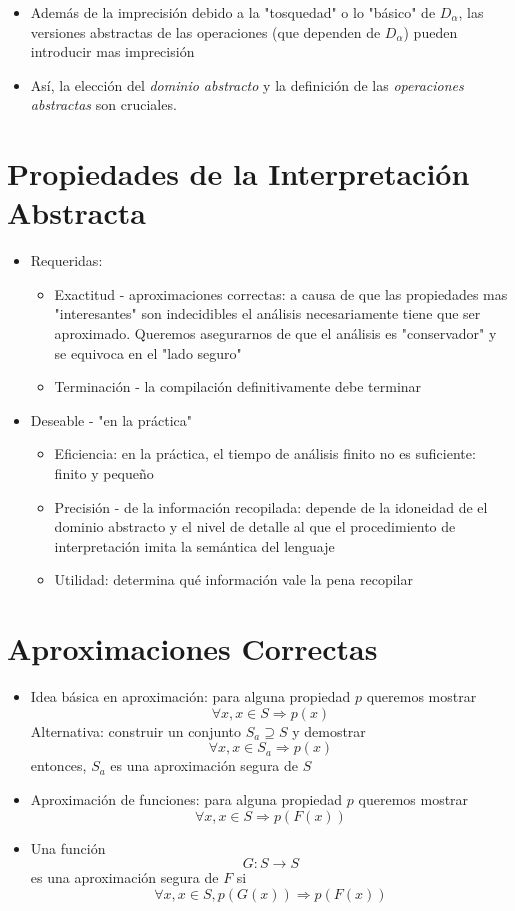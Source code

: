 \documentclass[11pt]{article}
\begin{document}
\begin{itemize}
\item Además de la imprecisión debido a la "tosquedad" o lo "básico" de
\(D_\alpha\), las versiones abstractas de las operaciones
(que dependen de  \(D_\alpha\)) pueden introducir mas imprecisión
\item Así, la elección del \emph{dominio abstracto} y la definición de las
\emph{operaciones abstractas} son cruciales.
\end{itemize}


\section*{Propiedades de la Interpretación Abstracta}
\label{sec:org1fe09b0}
\begin{itemize}
\item Requeridas:
\begin{itemize}
\item Exactitud - aproximaciones correctas: a causa de que las
propiedades mas "interesantes" son indecidibles el análisis
necesariamente tiene que ser aproximado. Queremos asegurarnos de
que el análisis es "conservador" y se equivoca en el "lado seguro"
\item Terminación - la compilación definitivamente debe terminar
\end{itemize}
\item Deseable - "en la práctica"
\begin{itemize}
\item Eficiencia: en la práctica, el tiempo de análisis finito no es
suficiente: finito y pequeño
\item Precisión - de la información recopilada: depende de la idoneidad
de el dominio abstracto y el nivel de detalle al que el
procedimiento de interpretación imita la semántica del lenguaje
\item Utilidad: determina qué información vale la pena recopilar
\end{itemize}
\end{itemize}

\section*{Aproximaciones Correctas}
\label{sec:orgc763099}
\begin{itemize}
\item Idea básica en aproximación: para alguna propiedad \(p\) queremos mostrar
      $$\forall x, x \in S \Rightarrow p(x)$$ 
Alternativa: construir un conjunto \(S_a \supseteq S\) y demostrar
     $$\forall x, x \in S_a \Rightarrow p(x)$$ 
entonces, \(S_a\) es una aproximación segura de \(S\)
\item Aproximación de funciones: para alguna propiedad \(p\) queremos mostrar 
$$\forall x, x \in S \Rightarrow p(F(x))$$
\item Una función
$$G: S \rightarrow S$$ es una aproximación segura de \(F\) si
$$\forall x, x \in S, p(G(x)) \Rightarrow p(F(x))$$
\end{itemize}
\end{document}

